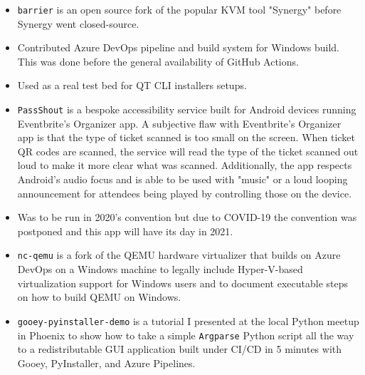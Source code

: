 \documentclass[10pt,letter,ragged2e]{altacv}
\begin{document}
\begin{paracol}{2}
\begin{itemize}
\item \texttt{barrier} is an open source fork of the popular KVM tool "Synergy" before Synergy went closed-source.
\item Contributed Azure DevOps pipeline and build system for Windows build. This was done before the general availability of GitHub Actions.
\item Used as a real test bed for QT CLI installers setups.
\end{itemize}

\divider


\begin{itemize}
\item \texttt{PassShout} is a bespoke accessibility service built for Android devices running Eventbrite's Organizer app. A subjective flaw with Eventbrite's Organizer app is that the type of ticket scanned is too small on the screen. When ticket QR codes are scanned, the service will read the type of the ticket scanned out loud to make it more clear what was scanned. Additionally, the app respects Android's audio focus and is able to be used with "music" or a loud looping announcement for attendees being played by controlling those on the device. 
\item Was to be run in 2020's convention but due to COVID-19 the convention was postponed and this app will have its day in 2021.
\end{itemize}

\divider


\begin{itemize}
\item \texttt{nc-qemu} is a fork of the QEMU hardware virtualizer that builds on Azure DevOps on a Windows machine to legally include Hyper-V-based virtualization support for Windows users and to document executable steps on how to build QEMU on Windows. 
\end{itemize}

\divider


\begin{itemize}
\item \texttt{gooey-pyinstaller-demo} is a tutorial I presented at the local Python meetup in Phoenix to show how to take a simple \texttt{Argparse} Python script all the way to a redistributable GUI application built under CI/CD in 5 minutes with Gooey, PyInstaller, and Azure Pipelines. 
\end{itemize}




\end{paracol}
\end{document}
